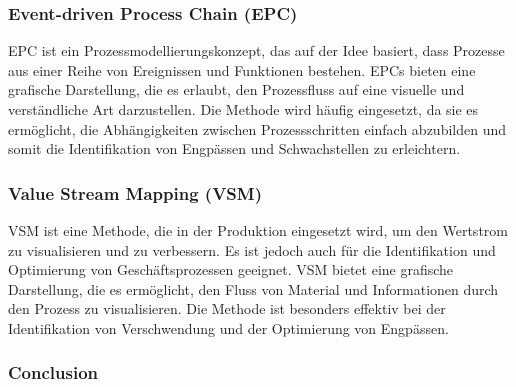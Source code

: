 \subsubsection{Event-driven Process Chain (EPC)}

EPC ist ein Prozessmodellierungskonzept, das auf der Idee basiert, dass Prozesse aus einer Reihe von Ereignissen und Funktionen bestehen.
EPCs bieten eine grafische Darstellung, die es erlaubt, den Prozessfluss auf eine visuelle und verständliche Art darzustellen.
Die Methode wird häufig eingesetzt, da sie es ermöglicht, die Abhängigkeiten zwischen Prozessschritten einfach abzubilden und somit die Identifikation von Engpässen und Schwachstellen zu erleichtern.

\subsubsection{Value Stream Mapping (VSM)}

VSM ist eine Methode, die in der Produktion eingesetzt wird, um den Wertstrom zu visualisieren und zu verbessern.
Es ist jedoch auch für die Identifikation und Optimierung von Geschäftsprozessen geeignet.
VSM bietet eine grafische Darstellung, die es ermöglicht, den Fluss von Material und Informationen durch den Prozess zu visualisieren.
Die Methode ist besonders effektiv bei der Identifikation von Verschwendung und der Optimierung von Engpässen.
\subsubsection{Conclusion}
